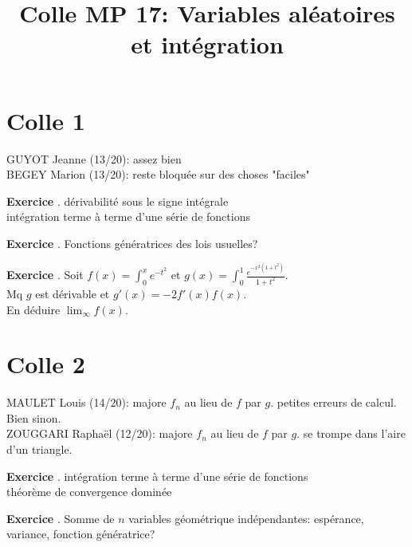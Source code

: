 \documentclass[10pt,a4paper]{article}
\title{Colle MP 17: Variables aléatoires et intégration}
\newcounter{question}
\newcounter{exo}
\newenvironment{exo}{\vspace{0.5cm}\setcounter{question}{0}\addtocounter{exo}{1} \noindent \textbf{Exercice \theexo}. \normalsize }{\par}
\begin{document}
	\maketitle
	
	\section*{Colle 1}	
	GUYOT Jeanne (13/20): assez bien\\
	BEGEY Marion (13/20): reste bloquée sur des choses "faciles"\\
	
	\begin{exo}
		dérivabilité sous le signe intégrale\\
		intégration terme à terme d’une série de fonctions
	\end{exo}

	\begin{exo}
		Fonctions génératrices des lois usuelles?
	\end{exo}
	
	\begin{exo}
		Soit $f(x) = \int_{0}^{x} e^{-t^2}$ et $g(x) = \int_{0}^{1} \frac{e^{-x^2 (1+t^2)}}{1+t^2}$.\\
		Mq $g$ est dérivable et $g'(x) = -2f'(x) f(x)$.\\
		En déduire $\lim_\infty f(x)$.
	\end{exo}
		
	\section*{Colle 2}
	\setcounter{exo}{0}
	MAULET Louis (14/20): majore $f_n$ au lieu de $f$ par $g$. petites erreurs de calcul. Bien sinon.\\
	ZOUGGARI Raphaël (12/20): majore $f_n$ au lieu de $f$ par $g$. se trompe dans l'aire d'un triangle.\\
	
	\begin{exo}
		intégration terme à terme d’une série de fonctions\\
		théorème de convergence dominée
	\end{exo}


	\begin{exo}
		Somme de $n$ variables géométrique indépendantes: espérance, variance, fonction génératrice? 
	\end{exo}	
	
\end{document}
